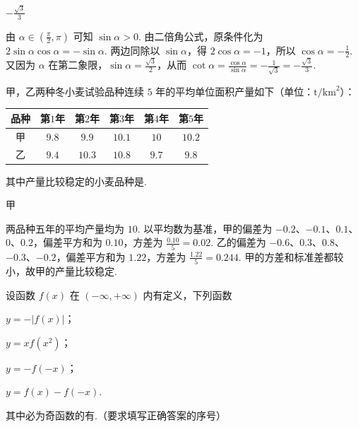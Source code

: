\begin{answer}
\(-\frac{\sqrt{3}}{3}\)
\end{answer}

\begin{solution}
由 \(\alpha \in \left(\frac{\pi}{2},\pi\right)\) 可知 \(\sin\alpha>0\). 由二倍角公式，原条件化为
\(2\sin\alpha\cos\alpha=-\sin\alpha\).
两边同除以 \(\sin\alpha\)，得 \(2\cos\alpha=-1\)，所以 \(\cos\alpha=-\frac{1}{2}\). 又因为 \(\alpha\) 在第二象限，\(\sin\alpha=\frac{\sqrt{3}}{2}\)，从而
\(\cot\alpha=\frac{\cos\alpha}{\sin\alpha}=-\frac{1}{\sqrt{3}}=-\frac{\sqrt{3}}{3}\).
\end{solution}

\begin{problem}
甲，乙两种冬小麦试验品种连续 \(5\) 年的平均单位面积产量如下（单位：\(\mathrm{t}/\mathrm{km}^2\)）：

\begin{center}
\begin{tabular}{|c|c|c|c|c|c|}
\hline
品种 & 第\(1\)年 & 第\(2\)年 & 第\(3\)年 & 第\(4\)年 & 第\(5\)年 \\
\hline
甲 & \(9.8\) & \(9.9\) & \(10.1\) & \(10\) & \(10.2\) \\
\hline
乙 & \(9.4\) & \(10.3\) & \(10.8\) & \(9.7\) & \(9.8\) \\
\hline
\end{tabular}
\end{center}

其中产量比较稳定的小麦品种是\fillinblank{}.
\end{problem}

\begin{answer}
甲
\end{answer}

\begin{solution}
两品种五年的平均产量均为 \(10\). 以平均数为基准，甲的偏差为 \(-0.2\)、\(-0.1\)、\(0.1\)、\(0\)、\(0.2\)，偏差平方和为 \(0.10\)，方差为 \(\frac{0.10}{5}=0.02\). 乙的偏差为 \(-0.6\)、\(0.3\)、\(0.8\)、\(-0.3\)、\(-0.2\)，偏差平方和为 \(1.22\)，方差为 \(\frac{1.22}{5}=0.244\). 甲的方差和标准差都较小，故甲的产量比较稳定.
\end{solution}

\begin{problem}
设函数 \(f(x)\) 在 \((-\infty, +\infty)\) 内有定义，下列函数

\begin{circlelist}
\item \(y = -|f(x)|\)；
\item \(y = x f(x^{2})\)；
\item \(y = -f(-x)\)；
\item \(y = f(x) - f(-x)\).
\end{circlelist}
其中必为奇函数的有\fillinblank{}.（要求填写正确答案的序号）
\end{problem}

